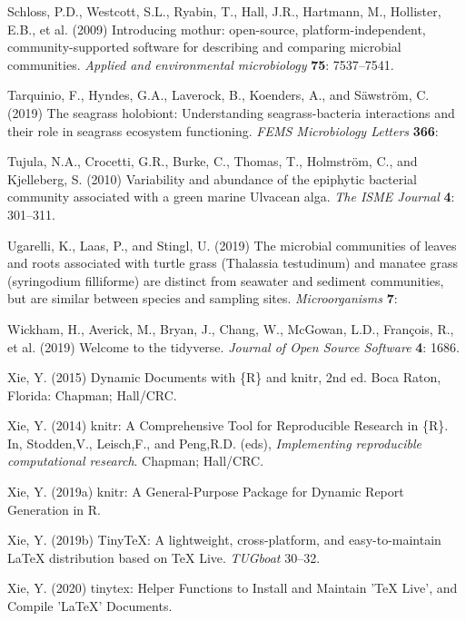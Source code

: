 \documentclass[12pt,]{article}
\begin{document}
\leavevmode\hypertarget{ref-Schloss2009}{}%
Schloss, P.D., Westcott, S.L., Ryabin, T., Hall, J.R., Hartmann, M.,
Hollister, E.B., et al. (2009) Introducing mothur: open-source,
platform-independent, community-supported software for describing and
comparing microbial communities. \emph{Applied and environmental
microbiology} \textbf{75}: 7537--7541.

\leavevmode\hypertarget{ref-Tarquinio2019}{}%
Tarquinio, F., Hyndes, G.A., Laverock, B., Koenders, A., and Säwström,
C. (2019) The seagrass holobiont: Understanding seagrass-bacteria
interactions and their role in seagrass ecosystem functioning.
\emph{FEMS Microbiology Letters} \textbf{366}:

\leavevmode\hypertarget{ref-Tujula2010}{}%
Tujula, N.A., Crocetti, G.R., Burke, C., Thomas, T., Holmström, C., and
Kjelleberg, S. (2010) Variability and abundance of the epiphytic
bacterial community associated with a green marine Ulvacean alga.
\emph{The ISME Journal} \textbf{4}: 301--311.

\leavevmode\hypertarget{ref-Ugarelli2019}{}%
Ugarelli, K., Laas, P., and Stingl, U. (2019) The microbial communities
of leaves and roots associated with turtle grass (Thalassia testudinum)
and manatee grass (syringodium filliforme) are distinct from seawater
and sediment communities, but are similar between species and sampling
sites. \emph{Microorganisms} \textbf{7}:

\leavevmode\hypertarget{ref-Wickham2019}{}%
Wickham, H., Averick, M., Bryan, J., Chang, W., McGowan, L.D., François,
R., et al. (2019) Welcome to the tidyverse. \emph{Journal of Open Source
Software} \textbf{4}: 1686.

\leavevmode\hypertarget{ref-Xie2015}{}%
Xie, Y. (2015) Dynamic Documents with \{R\} and knitr, 2nd ed. Boca
Raton, Florida: Chapman; Hall/CRC.

\leavevmode\hypertarget{ref-Xie2014}{}%
Xie, Y. (2014) knitr: A Comprehensive Tool for Reproducible Research in
\{R\}. In, Stodden,V., Leisch,F., and Peng,R.D. (eds),
\emph{Implementing reproducible computational research}. Chapman;
Hall/CRC.

\leavevmode\hypertarget{ref-Xie2019a}{}%
Xie, Y. (2019a) knitr: A General-Purpose Package for Dynamic Report
Generation in R.

\leavevmode\hypertarget{ref-Xie2019}{}%
Xie, Y. (2019b) TinyTeX: A lightweight, cross-platform, and
easy-to-maintain LaTeX distribution based on TeX Live. \emph{TUGboat}
30--32.

\leavevmode\hypertarget{ref-Xie2020}{}%
Xie, Y. (2020) tinytex: Helper Functions to Install and Maintain 'TeX
Live', and Compile 'LaTeX' Documents.
\end{document}
